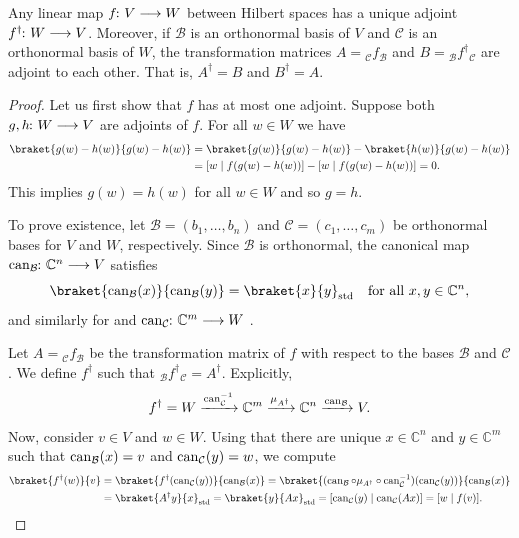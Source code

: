 \documentclass[a4paper, oneside, 12pt]{amsart}
\begin{document}
\begin{proposition}\label{prop:adjoint-morph-is-adjoint-matrix}
  Any linear map \(f \from V \to W\) between Hilbert spaces has a unique adjoint \(f^{\dagger} \from W \to V\).
  Moreover, if \(\mathcal{B}\) is an orthonormal basis of \(V\) and \(\mathcal{C}\) is an orthonormal basis of \(W\), the transformation matrices \(A = {_{\mathcal{C}}f_{\mathcal{B}}}\) and \(B = {_{\mathcal{B}}{f^{\dagger}}{}_{\mathcal{C}}}\) are adjoint to each other.
  That is, \(A^{\dagger} = B\) and \(B^{\dagger} =A\).
\end{proposition}
\begin{proof}
  Let us first show that \(f\) has at most one adjoint.
  Suppose both \(g,h \from W\to V\) are adjoints of \(f\).
  For all \(w\in W\) we have
  \begin{align*}
    \braket{g(w)- h(w)}{g(w) - h(w)}
    & = \braket{g(w)}{g(w) - h(w)} - \braket{h(w)}{g(w) - h(w)}\\
    & = [w\mid f(g(w) - h(w))] - [w \mid f(g(w) - h(w))]
      = 0.
  \end{align*}
  This implies  \(g(w) = h(w)\) for all \(w\in W\) and so \(g = h\).

  To prove existence, let \( \mathcal{B} = (b_1, \dots, b_n) \) and \( \mathcal{C} = (c_1, \dots, c_m) \) be orthonormal bases for \( V \) and \( W \), respectively.
  Since \( \mathcal{B}\) is orthonormal, the canonical map \( \can_{\mathcal{B}} \from \mathbb{C}^n \to V \) satisfies
  \begin{equation*}
    \braket{\can_{\mathcal{B}}(x)}{\can_{\mathcal{B}}(y)} = \braket{x}{y}_{\mathrm{std}} \quad \text{for all } x, y \in \mathbb{C}^n,
  \end{equation*}
  and similarly for  and \( \can_{\mathcal{C}} \from \mathbb{C}^m \to W \) .

  Let \(A= {}_{\mathcal{C}}f_{\mathcal{B}}\) be the transformation matrix of \(f\) with respect to the bases \(\mathcal{B}\) and \(\mathcal{C}\).
  We define \(f^{\dagger}\) such that \(_{\mathcal{B}}f^{\dagger}{}_{\mathcal{C}} = A^{\dagger}\).
  Explicitly,
  \begin{equation*}
    f^{\dagger }= W \xrightarrow{\operatorname{can}_{\mathcal{C}}^{-1}} \mathbb{C}^{m}\xrightarrow{\mu_{A^{\dagger}}} \mathbb{C}^{n}\xrightarrow{\operatorname{can}_{\mathcal{B}}} V.
  \end{equation*}
  Now, consider \(v \in V\) and \(w\in W\).
  Using that there are unique \(x \in \mathbb{C}^{n}\) and \(y \in \mathbb{C}^{m}\) such that
  \(\operatorname{can}_{\mathcal{B}}(x) = v\) and \(\operatorname{can}_{\mathcal{C}}(y) = w\), we compute
  \begin{align*}
    \braket{f^{\dagger}(w)}{v}
    & = \braket{f^{\dagger} (\can_{\mathcal{C}}(y))}{\can_{\mathcal{B}}(x)}
      = \braket{(\can_{\mathcal{B}} \circ \mu_{A^{\dagger}} \circ \can_{\mathcal{C}}^{-1}) (\can _{\mathcal{C}} (y))}{\can_{\mathcal{B}}(x)} \\
    & = \braket{A^{\dagger}y}{x}_{\mathrm{std}}
      = \braket{y}{Ax}_{\mathrm{std}}
      = [\can_{\mathcal{C}}(y) \mid \can_{\mathcal{C}}(Ax)] = [w\mid f(v)]. \qedhere
  \end{align*}
\end{proof}
\end{document}
